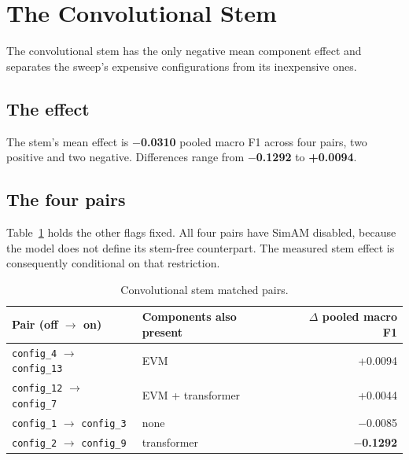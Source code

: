 
\section{The Convolutional Stem}
\label{sec:cnn-results}

The convolutional stem has the only negative mean component effect and separates the sweep's expensive configurations from its inexpensive ones.

\subsection{The effect}
\label{sec:cnn-effect-result}

The stem's mean effect is \textbf{$-$0.0310} pooled macro F1 across four pairs, two positive and two negative. Differences range from \textbf{$-$0.1292} to \textbf{+0.0094}.

\subsection{The four pairs}
\label{sec:cnn-four-pairs}

Table~\ref{tab:cnn-pairs-result} holds the other flags fixed. All four pairs have SimAM disabled, because the model does not define its stem-free counterpart. The measured stem effect is consequently conditional on that restriction.

\begin{table}[htbp]
	\centering
	\begin{tabular}{l l r}
		\hline
		\textbf{Pair (off $\rightarrow$ on)} & \textbf{Components also present} & \textbf{$\Delta$ pooled macro F1} \\
		\hline
		\texttt{config\_4} $\rightarrow$ \texttt{config\_13} & EVM               & +0.0094 \\
		\texttt{config\_12} $\rightarrow$ \texttt{config\_7} & EVM + transformer & +0.0044 \\
		\texttt{config\_1} $\rightarrow$ \texttt{config\_3}  & none              & $-$0.0085 \\
		\texttt{config\_2} $\rightarrow$ \texttt{config\_9}  & transformer       & \textbf{$-$0.1292} \\
		\hline
	\end{tabular}
	\caption[Convolutional stem matched pairs]{Convolutional stem matched pairs.}
	\label{tab:cnn-pairs-result}
\end{table}

